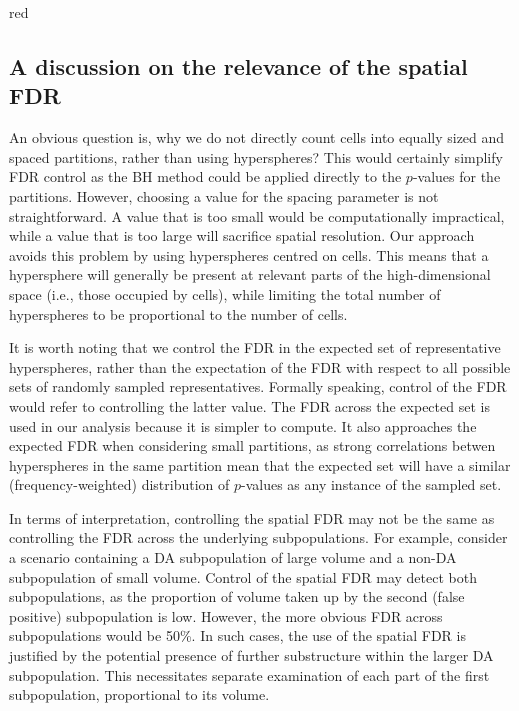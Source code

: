 \documentclass{article}
\begin{document}
\begin{color}{red}
\subsection{A discussion on the relevance of the spatial FDR}
An obvious question is, why we do not directly count cells into equally sized and spaced partitions, rather than using hyperspheres?
This would certainly simplify FDR control as the BH method could be applied directly to the $p$-values for the partitions.
However, choosing a value for the spacing parameter is not straightforward.
A value that is too small would be computationally impractical, while a value that is too large will sacrifice spatial resolution.
Our approach avoids this problem by using hyperspheres centred on cells.
This means that a hypersphere will generally be present at relevant parts of the high-dimensional space (i.e., those occupied by cells), while limiting the total number of hyperspheres to be proportional to the number of cells.

It is worth noting that we control the FDR in the expected set of representative hyperspheres, rather than the expectation of the FDR with respect to all possible sets of randomly sampled representatives.
Formally speaking, control of the FDR would refer to controlling the latter value.
The FDR across the expected set is used in our analysis because it is simpler to compute.
It also approaches the expected FDR when considering small partitions, as strong correlations betwen hyperspheres in the same partition mean that the expected set will have a similar (frequency-weighted) distribution of $p$-values as any instance of the sampled set.

In terms of interpretation, controlling the spatial FDR may not be the same as controlling the FDR across the underlying subpopulations.
For example, consider a scenario containing a DA subpopulation of large volume and a non-DA subpopulation of small volume.
Control of the spatial FDR may detect both subpopulations, as the proportion of volume taken up by the second (false positive) subpopulation is low.
However, the more obvious FDR across subpopulations would be 50\%.
In such cases, the use of the spatial FDR is justified by the potential presence of further substructure within the larger DA subpopulation.
This necessitates separate examination of each part of the first subpopulation, proportional to its volume.


\end{color}
\end{document}
